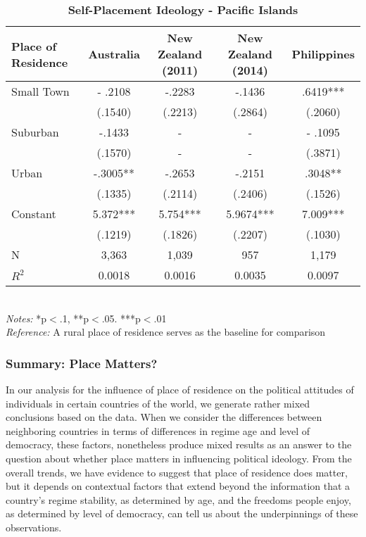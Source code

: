 \documentclass[12pt, titlepage]{article}
\newcommand\e{\emph}
\newcommand\tb{\textbf}
\begin{document}
\begin{landscape}
	\begin{table}
		\centering
		\def\arraystretch{1.5}
		\caption{\tb{Self-Placement Ideology - Pacific Islands}}
		\begin{tabulary}{\linewidth}{l c c c c}
			\\
			\hline
			\tb{Place of Residence}&\tb{Australia}&\tb{New Zealand (2011)}&\tb{New Zealand (2014)} &\tb{Philippines}\\
			\hline
			Small Town  & - .2108  & -.2283  &-.1436 &  .6419***  \\      
			& (.1540)   & (.2213) & (.2864)  & (.2060)    \\
			Suburban  & -.1433   & -   & -    & - .1095   \\ 
			& (.1570)   & -  & -    & (.3871)       \\
			Urban  & -.3005** & -.2653  & -.2151 & .3048** \\
			& (.1335) &(.2114)   & (.2406) & (.1526)      \\
			Constant   & 5.372***   & 5.754*** & 5.9674***  & 7.009***   \\
			&(.1219)&(.1826)&(.2207)&(.1030) \\
			N 	 & 3,363   &1,039    & 957   & 1,179  \\
			$R^2$  & 0.0018   &0.0016  &0.0035  &0.0097     \\
			\hline                                       
		\end{tabulary} 
		\\
		\e{Notes:} *p$<$.1, **p$<$.05. ***p$<$.01 \\
		\e{Reference:} A rural place of residence serves as the baseline for comparison
		\label{table13}
	\end{table}
\end{landscape}

\subsubsection{Summary: Place Matters?}

In our analysis for the influence of place of residence on the political attitudes of individuals in certain countries of the world, we generate rather mixed conclusions based on the data. When we consider the differences between neighboring countries in terms of differences in regime age and level of democracy, these factors, nonetheless produce mixed results as an answer to the question about whether place matters in influencing political ideology. From the overall trends, we have evidence to suggest that place of residence does matter, but it depends on contextual factors that extend beyond the information that a country's regime stability, as determined by age, and the freedoms people enjoy, as determined by level of democracy, can tell us about the underpinnings of these observations.
\end{document}
